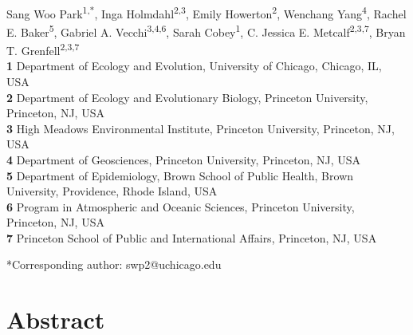 \documentclass[12pt]{article}
\date{\today}
\begin{document}
\begin{flushleft}{
	\Large
	\textbf{}
}
\newline
\\
Sang Woo Park\textsuperscript{1,*}, Inga Holmdahl\textsuperscript{2,3}, Emily Howerton\textsuperscript{2}, Wenchang Yang\textsuperscript{4}, Rachel E. Baker\textsuperscript{5}, Gabriel A. Vecchi\textsuperscript{3,4,6}, Sarah Cobey\textsuperscript{1}, C. Jessica E. Metcalf\textsuperscript{2,3,7}, Bryan T. Grenfell\textsuperscript{2,3,7}
\\
\bigskip
\textbf{1} Department of Ecology and Evolution, University of Chicago, Chicago, IL, USA
\\
\textbf{2} Department of Ecology and Evolutionary Biology, Princeton University, Princeton, NJ, USA
\\
\textbf{3} High Meadows Environmental Institute, Princeton University, Princeton, NJ, USA
\\
\textbf{4} Department of Geosciences, Princeton University, Princeton, NJ, USA
\\
\textbf{5} Department of Epidemiology, Brown School of Public Health, Brown University, Providence, Rhode Island, USA
\\
\textbf{6} Program in Atmospheric and Oceanic Sciences, Princeton University, Princeton, NJ, USA
\\
\textbf{7} Princeton School of Public and International Affairs, Princeton, NJ, USA
\bigskip

*Corresponding author: swp2@uchicago.edu
\end{flushleft}

\section*{Abstract}
\end{document}
